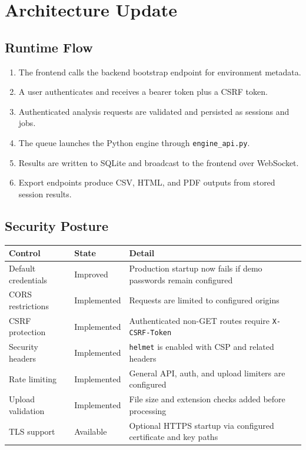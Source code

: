 \documentclass[12pt,a4paper]{report}
\begin{document}
\chapter{Architecture Update}

\section{Runtime Flow}

\begin{enumerate}
  \item The frontend calls the backend bootstrap endpoint for environment metadata.
  \item A user authenticates and receives a bearer token plus a CSRF token.
  \item Authenticated analysis requests are validated and persisted as sessions and jobs.
  \item The queue launches the Python engine through \texttt{engine\_api.py}.
  \item Results are written to SQLite and broadcast to the frontend over WebSocket.
  \item Export endpoints produce CSV, HTML, and PDF outputs from stored session results.
\end{enumerate}

\section{Security Posture}

\begin{longtable}{p{4.5cm}p{3cm}p{5.5cm}}
\toprule
Control & State & Detail \\
\midrule
Default credentials & Improved & Production startup now fails if demo passwords remain configured \\
CORS restrictions & Implemented & Requests are limited to configured origins \\
CSRF protection & Implemented & Authenticated non-GET routes require \texttt{X-CSRF-Token} \\
Security headers & Implemented & \texttt{helmet} is enabled with CSP and related headers \\
Rate limiting & Implemented & General API, auth, and upload limiters are configured \\
Upload validation & Implemented & File size and extension checks added before processing \\
TLS support & Available & Optional HTTPS startup via configured certificate and key paths \\
\bottomrule
\end{longtable}
\end{document}
